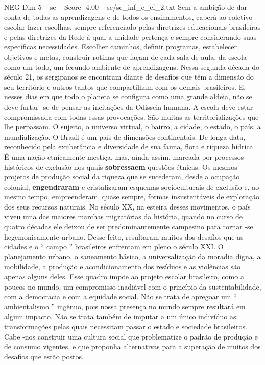 \begin{textsample}{NEG Dim 5 – se – Score -4.00 – se/se\_inf\_e\_ef\_2.txt}
Sem a ambição de dar conta de todas as aprendizagens e de todos os ensinamentos, caberá ao coletivo escolar fazer escolhas, sempre referenciado pelas diretrizes educacionais brasileiras e pelas diretrizes da Rede à qual a unidade pertença e sempre considerando suas específicas necessidades.
Escolher caminhos, definir programas, estabelecer objetivos e metas, construir rotinas que façam de cada sala de aula, da escola como um todo, um fecundo ambiente de aprendizagens.
Nessa segunda década do século 21, os sergipanos se encontram diante de desafios que têm a dimensão do seu território e outros tantos que compartilham com os demais brasileiros.
E, nesses dias em que todo o planeta se configura como uma grande aldeia, não se deve furtar -se de pensar as incitações da Odisseia humana.
A escola deve estar compromissada com todas essas provocações.
São muitas as territorializações que lhe perpassam.
O sujeito, o universo virtual, o bairro, a cidade, o estado, o país, a mundialização.
O Brasil é um país de dimensões continentais.
De longa data, reconhecido pela exuberância e diversidade de sua fauna, flora e riqueza hídrica.
É uma nação etnicamente mestiça, mas, ainda assim, marcada por processos históricos de exclusão nos quais \textbf{sobressaem} questões étnicas.
Os mesmos projetos de produção social da riqueza que se sucederam, desde a ocupação colonial, \textbf{engendraram} e cristalizaram esquemas socioculturais de exclusão e, ao mesmo tempo, empreenderam, quase sempre, formas insustentáveis de exploração dos seus recursos naturais.
No século XX, na esteira desses movimentos, o país viveu uma das maiores marchas migratórias da história, quando no curso de quatro décadas ele deixou de ser predominantemente campesino para tornar -se hegemonicamente urbano.
Desse feito, resultaram muitos dos desafios que as cidades e o “ campo ” brasileiros enfrentam em pleno o século XXI.
O planejamento urbano, o saneamento básico, a universalização da moradia digna, a mobilidade, a produção e acondicionamento dos resíduos e as violências são apenas alguns deles.
Esse quadro impõe ao projeto escolar brasileiro, como a poucos no mundo, um compromisso inadiável com o princípio da sustentabilidade, com a democracia e com a equidade social.
Não se trata de apregoar um “ ambientalismo ” ingênuo, pois nossa presença no mundo sempre resultará em algum impacto.
Não se trata também de imputar a um único indivíduo as transformações pelas quais necessitam passar o estado e sociedade brasileiros.
Cabe -nos construir uma cultura social que problematize o padrão de produção e de consumo vigentes, e que proponha alternativas para a superação de muitos dos desafios que estão postos.

\end{textsample}
